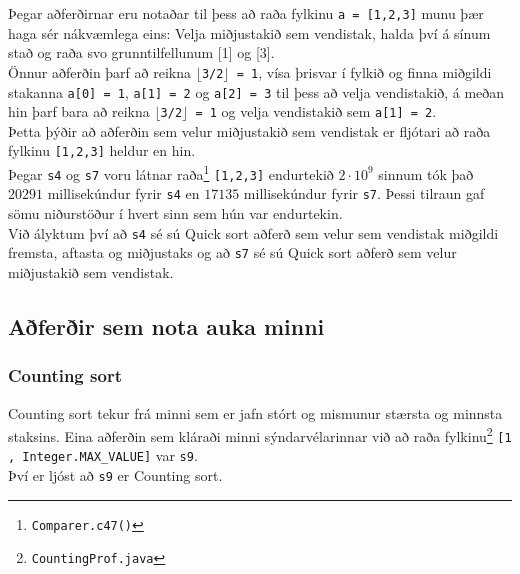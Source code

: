 \documentclass[a4paper,oneside]{article}
\begin{document}
\noindent Þegar aðferðirnar eru notaðar til þess að raða fylkinu \texttt{a = [1,2,3]} munu þær haga sér nákvæmlega eins: Velja miðjustakið sem vendistak, halda því á sínum stað og raða svo grunntilfellunum [1] og [3]. \\

\noindent Önnur aðferðin þarf að reikna \texttt{$\lfloor$3/2$\rfloor$ = 1}, vísa þrisvar í fylkið og finna miðgildi stakanna \texttt{a[0] = 1}, \texttt{a[1] = 2} og \texttt{a[2] = 3} til þess að velja vendistakið, á meðan hin þarf bara að reikna \texttt{$\lfloor$3/2$\rfloor$ = 1} og velja vendistakið sem \texttt{a[1] = 2}.\\

\noindent Þetta þýðir að aðferðin sem velur miðjustakið sem vendistak er fljótari að raða fylkinu \texttt{[1,2,3]} heldur en hin.\\

\noindent Þegar \texttt{s4} og \texttt{s7} voru látnar raða\footnote{\texttt{Comparer.c47()}} \texttt{[1,2,3]} endurtekið $2\cdot 10^9$ sinnum tók það $20291$ millisekúndur fyrir \texttt{s4} en $17135$ millisekúndur fyrir \texttt{s7}. Þessi tilraun gaf sömu niðurstöður í hvert sinn sem hún var endurtekin.\\

\noindent Við ályktum því að \texttt{s4} sé sú Quick sort aðferð sem velur sem vendistak miðgildi fremsta, aftasta og miðjustaks og að \texttt{s7} sé sú Quick sort aðferð sem velur miðjustakið sem vendistak.

\subsection{Aðferðir sem nota auka minni}
\subsubsection{Counting sort}
\noindent Counting sort tekur frá minni sem er jafn stórt og mismunur stærsta og minnsta staksins. Eina aðferðin sem kláraði minni sýndarvélarinnar við að raða fylkinu\footnote{\texttt{CountingProf.java}} \texttt{[1 , Integer.MAX\_VALUE]} var \texttt{s9}.\\

\noindent Því er ljóst að \texttt{s9} er Counting sort.

\end{document}

